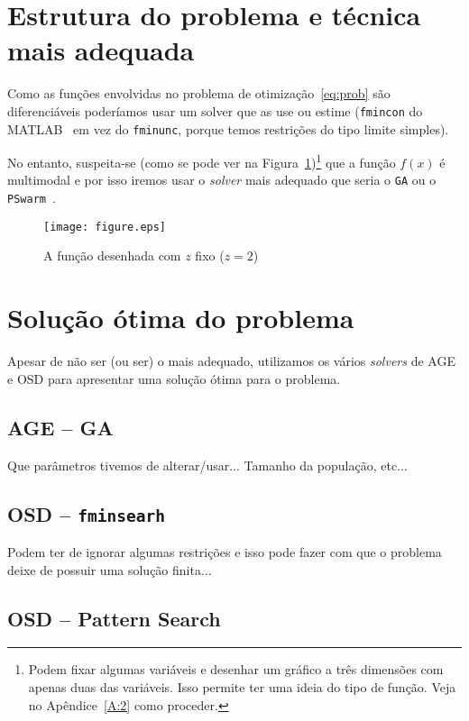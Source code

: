 \documentclass[a4paper,12pt]{article}
\begin{document}
\section{Estrutura do problema e técnica mais adequada}

Como as funções envolvidas no problema de otimização~\eqref{eq:prob} são diferenciáveis poderíamos usar um solver que as use ou estime ({\tt fmincon} do MATLAB~\cite{matlab} em vez do {\tt fminunc}, porque temos restrições do tipo limite simples).

No entanto, suspeita-se (como se pode ver na Figura~\ref{fig:land})\footnote{Podem fixar algumas variáveis e desenhar um gráfico a três dimensões com apenas duas das variáveis. Isso permite ter uma ideia do tipo de função. Veja no Apêndice~\ref{A:2} como proceder.} que a função $f(x)$ é multimodal e por isso iremos usar o \emph{solver} mais adequado que seria o {\tt GA} ou o {\tt PSwarm}~\cite{AIFVaz_LNVicente_2009}.

\begin{figure}
\begin{center}
\texttt{[image: figure.eps]}
\end{center}
\caption{\label{fig:land}A função desenhada com $z$ fixo ($z=2$)}
\end{figure}


\section{Solução ótima do problema}

Apesar de não ser (ou ser) o mais adequado, utilizamos os vários \emph{solvers} de AGE e OSD para apresentar uma solução ótima para o problema.

\subsection{AGE -- GA}

Que parâmetros tivemos de alterar/usar... Tamanho da população, etc...

\subsection{OSD -- {\tt fminsearh}}

Podem ter de ignorar algumas restrições e isso pode fazer com que o problema deixe de possuir uma solução finita...

\subsection{OSD -- Pattern Search}
\end{document}
